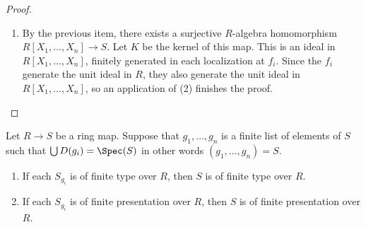 \begin{proof}
\begin{enumerate}
$S$. Let $Y$ be the union of these sets. This is still a finite set.
Consider the algebra homomorphism $R[X_y]_{y \in Y} \rightarrow S$
induced by $Y$. Since it is an algebra homomorphism, the image $T$
is an $R$-submodule of the $R$-module $S$, so we can consider the
quotient module $S/T$. By assumption, this is zero if we localize
at the $f_i$, so it is zero by (1) and therefore $S$ is an
$R$-algebra of finite type.
\item By the previous item, there exists a surjective $R$-algebra
homomorphism $R[X_1, \ldots, X_n] \rightarrow S$. Let $K$ be the kernel
of this map. This is an ideal in $R[X_1, \ldots, X_n]$, finitely generated
in each localization at $f_i$. Since the $f_i$ generate the unit ideal
in $R$, they also generate the unit ideal in $R[X_1, \ldots, X_n]$, so an
application of (2) finishes the proof.
\end{enumerate}
\end{proof}

\begin{lemma}
\label{lemma-cover-upstairs}
Let $R \to S$ be a ring map.
Suppose that $g_1, \ldots, g_n$ is a finite list of
elements of $S$ such that $\bigcup D(g_i) = \Spec(S)$
in other words $(g_1, \ldots, g_n) = S$.
\begin{enumerate}
\item If each $S_{g_i}$ is of finite type over $R$, then $S$ is
of finite type over $R$.
\item If each $S_{g_i}$ is of finite presentation over $R$,
then $S$ is of finite presentation over $R$.
\end{enumerate}
\end{lemma}

